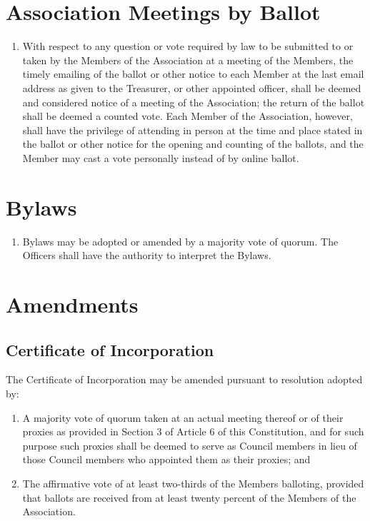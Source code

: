 \section{Association Meetings by Ballot}
\begin{enumerate}
	\item With respect to any question or vote required by law to be submitted to or taken by the Members of the Association at a meeting of the Members, the timely emailing of the ballot or other notice to each Member at the last email address as given to the Treasurer, or other appointed officer, shall be deemed and considered notice of a meeting of the Association; the return of the ballot shall be deemed a counted vote. Each Member of the Association, however, shall have the privilege of attending in person at the time and place stated in the ballot or other notice for the opening and counting of the ballots, and the Member may cast a vote personally instead of by online ballot.
\end{enumerate}

\section{Bylaws}
\begin{enumerate}
	\item Bylaws may be adopted or amended by a majority vote of quorum. The Officers shall have the authority to interpret the Bylaws.
\end{enumerate}

\section{Amendments}

\subsection{Certificate of Incorporation}
The Certificate of Incorporation may be amended pursuant to resolution adopted by:
\begin{enumerate}
	\item A majority vote of quorum taken at an actual meeting thereof or of their proxies as provided in Section 3 of Article 6 of this Constitution, and for such purpose such proxies shall be deemed to serve as Council members in lieu of those Council members who appointed them as their proxies; and
	\item The affirmative vote of at least two-thirds of the Members balloting, provided that ballots are received from at least twenty percent of the Members of the Association.
\end{enumerate}

